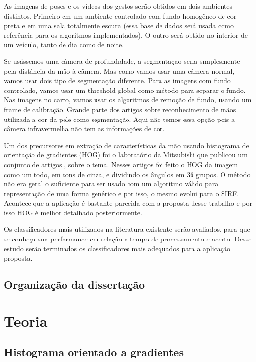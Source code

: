 As imagens de poses e os vídeos dos gestos serão obtidos em  dois ambientes distintos. Primeiro em um ambiente controlado com fundo homogêneo de cor preta e em uma sala totalmente escura (essa base de dados será usada como referência para os algoritmos implementados). O outro será obtido no interior de um veículo, tanto de dia como de noite.

Se usássemos uma câmera de profundidade, a segmentação seria simplesmente pela distância da mão à câmera. Mas como vamos usar uma câmera normal, vamos usar dois tipo de segmentação diferente. 
Para as imagens com fundo controlado, vamos usar um threshold global como método para separar o fundo. Nas imagens no carro, vamos usar os algoritmos de remoção de fundo, usando um frame de calibração.
Grande parte dos artigos sobre reconhecimento de mãos utilizada a cor da pele como segmentação. Aqui não temos essa opção pois a câmera infravermelha não tem as informações de cor.

Um dos precursores em extração de características da mão usando histograma de orientação de gradientes (HOG) foi o laboratório da Mitsubishi que publicou um conjunto de artigos \cite{ref3}, \cite{ref4} sobre o tema. Nesses artigos foi feito o HOG da imagem como um todo, em tons de cinza, e dividindo os ângulos em 36 grupos. O método não era geral o suficiente para ser usado com um algoritmo válido para representação de uma forma genérico e por isso, o mesmo evolui para o SIRF. Acontece que a aplicação é bastante parecida com a proposta desse trabalho e por isso HOG é melhor detalhado posteriormente.

Os classificadores mais utilizados na literatura existente serão avaliados, para que se conheça sua performance em relação a tempo de processamento e acerto. Desse estudo serão terminados os classificadores mais adequados para a aplicação proposta.

\section{Organização da dissertação}


\chapter{Teoria}

\section{Histograma orientado a gradientes}

